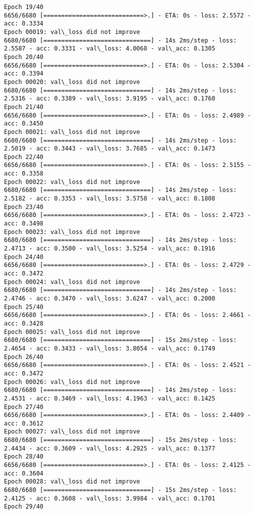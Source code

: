 \documentclass[11pt]{article}
\begin{document}
\begin{Verbatim}[commandchars=\\\{\}]
Epoch 19/40
6656/6680 [============================>.] - ETA: 0s - loss: 2.5572 - acc: 0.3334
Epoch 00019: val\_loss did not improve
6680/6680 [==============================] - 14s 2ms/step - loss: 2.5587 - acc: 0.3331 - val\_loss: 4.0068 - val\_acc: 0.1305
Epoch 20/40
6656/6680 [============================>.] - ETA: 0s - loss: 2.5304 - acc: 0.3394
Epoch 00020: val\_loss did not improve
6680/6680 [==============================] - 14s 2ms/step - loss: 2.5316 - acc: 0.3389 - val\_loss: 3.9195 - val\_acc: 0.1760
Epoch 21/40
6656/6680 [============================>.] - ETA: 0s - loss: 2.4989 - acc: 0.3450
Epoch 00021: val\_loss did not improve
6680/6680 [==============================] - 14s 2ms/step - loss: 2.5019 - acc: 0.3443 - val\_loss: 3.7685 - val\_acc: 0.1473
Epoch 22/40
6656/6680 [============================>.] - ETA: 0s - loss: 2.5155 - acc: 0.3358
Epoch 00022: val\_loss did not improve
6680/6680 [==============================] - 14s 2ms/step - loss: 2.5182 - acc: 0.3353 - val\_loss: 3.5758 - val\_acc: 0.1808
Epoch 23/40
6656/6680 [============================>.] - ETA: 0s - loss: 2.4723 - acc: 0.3498
Epoch 00023: val\_loss did not improve
6680/6680 [==============================] - 14s 2ms/step - loss: 2.4713 - acc: 0.3500 - val\_loss: 3.5254 - val\_acc: 0.1916
Epoch 24/40
6656/6680 [============================>.] - ETA: 0s - loss: 2.4729 - acc: 0.3472
Epoch 00024: val\_loss did not improve
6680/6680 [==============================] - 14s 2ms/step - loss: 2.4746 - acc: 0.3470 - val\_loss: 3.6247 - val\_acc: 0.2000
Epoch 25/40
6656/6680 [============================>.] - ETA: 0s - loss: 2.4661 - acc: 0.3428
Epoch 00025: val\_loss did not improve
6680/6680 [==============================] - 15s 2ms/step - loss: 2.4654 - acc: 0.3433 - val\_loss: 3.8054 - val\_acc: 0.1749
Epoch 26/40
6656/6680 [============================>.] - ETA: 0s - loss: 2.4521 - acc: 0.3472
Epoch 00026: val\_loss did not improve
6680/6680 [==============================] - 14s 2ms/step - loss: 2.4531 - acc: 0.3469 - val\_loss: 4.1963 - val\_acc: 0.1425
Epoch 27/40
6656/6680 [============================>.] - ETA: 0s - loss: 2.4409 - acc: 0.3612
Epoch 00027: val\_loss did not improve
6680/6680 [==============================] - 15s 2ms/step - loss: 2.4434 - acc: 0.3609 - val\_loss: 4.2925 - val\_acc: 0.1377
Epoch 28/40
6656/6680 [============================>.] - ETA: 0s - loss: 2.4125 - acc: 0.3604
Epoch 00028: val\_loss did not improve
6680/6680 [==============================] - 15s 2ms/step - loss: 2.4125 - acc: 0.3608 - val\_loss: 3.9984 - val\_acc: 0.1701
Epoch 29/40

\end{Verbatim}
\end{document}
